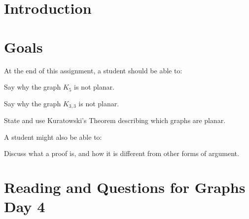 \documentclass[12pt,letterpaper]{article}
\theoremstyle{definition}
\begin{document}
\setlength{\parskip}{1ex plus 0.5ex minus 0.2ex}
\setlength{\parindent}{0pt}

\pagestyle{fancy}
\cfoot{}

\section*{Introduction}


\section*{Goals}
At the end of this assignment, a student should be able to:
\begin{compactitem}
\item Say why the graph $K_5$ is not planar.
\item Say why the graph $K_{3,3}$ is not planar.
\item State and use Kuratowski's Theorem describing which graphs are planar.
\end{compactitem}
A student might also be able to:
\begin{compactitem}
\item Discuss what a proof is, and how it is different from other forms of argument.
\end{compactitem}

\section*{Reading and Questions for Graphs Day 4}

\end{document}
